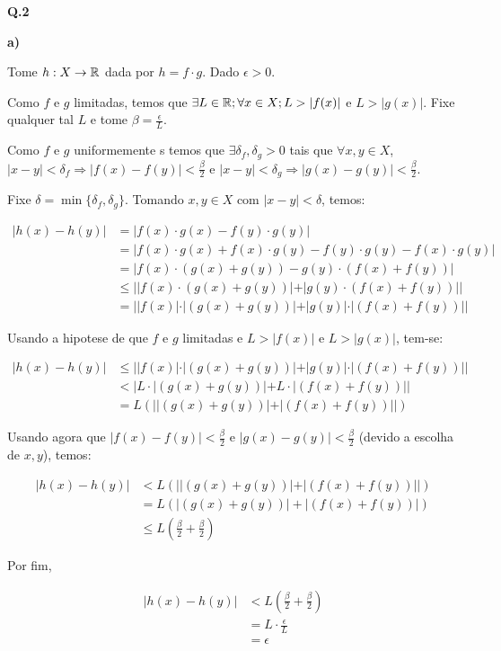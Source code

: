 \textbf{Q.2}

\textbf{a)}

Tome $h:X\rightarrow\mathbb{R}$ dada por $h = f\cdot g$. Dado $\epsilon > 0$.

Como $f$ e $g$ \sao limitadas, temos que $\exists L\in\mathbb{R}; \forall x\in X; L>|f(x)|$ e $L>|g(x)|$. Fixe qualquer tal $L$ e tome \tambem $\beta = \frac{\epsilon}{L}$.


Como $f$ e $g$ uniformemente \continua s temos que $\exists \delta_f,\delta_g > 0$ tais que \mbox{$\forall x,y \in X$}, $|x-y| < \delta_f \Rightarrow |f(x)-f(y)| < \frac{\beta}{2}$ e $|x-y| < \delta_g \Rightarrow |g(x)-g(y)| < \frac{\beta}{2}$.


Fixe \entao $\delta = \min\{\delta_f, \delta_g\}$. Tomando $x,y \in X$ com $|x-y| < \delta$, temos:

\begin{align*}
	|h(x) - h(y)| &= |f(x)\cdot g(x) - f(y)\cdot g(y)| \\
	&= |f(x)\cdot g(x) + f(x)\cdot g(y) - f(y)\cdot g(y) - f(x)\cdot g(y)| \\
	&= |f(x)\cdot(g(x) + g(y)) - g(y)\cdot (f(x) + f(y))| \\
	&\leq ||f(x)\cdot(g(x) + g(y))| + |g(y)\cdot (f(x) + f(y))||\\
	&= ||f(x)|\cdot|(g(x) + g(y))| + |g(y)|\cdot|(f(x) + f(y))||
\end{align*}

Usando a hipotese de que $f$ e $g$ \sao limitadas e $L>|f(x)|$ e $L>|g(x)|$, tem-se:

\begin{align*}
	|h(x) - h(y)| &\le ||f(x)|\cdot|(g(x) + g(y))| + |g(y)|\cdot|(f(x) + f(y))|| \\
	&< |L\cdot|(g(x) + g(y))| + L\cdot|(f(x) + f(y))||\\
	&= L(||(g(x) + g(y))| + |(f(x) + f(y))||)
\end{align*}

Usando agora que $|f(x)-f(y)| < \frac{\beta}{2}$ e $|g(x)-g(y)| < \frac{\beta}{2}$ (devido a escolha de $x,y$), temos:

\begin{align*}
	|h(x) - h(y)| &< L(||(g(x) + g(y))| + |(f(x) + f(y))||)\\
	&= L(|(g(x) + g(y))| + |(f(x) + f(y))|)\\
	&\le L(\frac{\beta}{2} + \frac{\beta}{2})
\end{align*}

Por fim,

\begin{align*}
	|h(x) - h(y)| &<  L(\frac{\beta}{2} + \frac{\beta}{2}) \\
	&= L\cdot\frac{\epsilon}{L}\\
	&=\epsilon
\end{align*}


